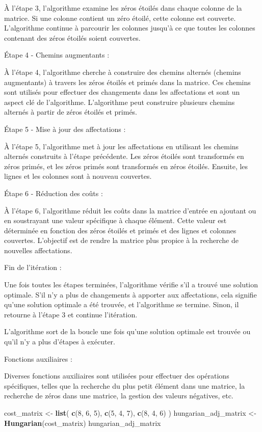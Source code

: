 \documentclass[
]{article}
\newenvironment{Shaded}{\begin{snugshade}}{\end{snugshade}}
\newcommand{\DecValTok}[1]{\textcolor[rgb]{0.00,0.00,0.81}{#1}}
\newcommand{\FunctionTok}[1]{\textcolor[rgb]{0.13,0.29,0.53}{\textbf{#1}}}
\newcommand{\NormalTok}[1]{#1}
\newcommand{\OtherTok}[1]{\textcolor[rgb]{0.56,0.35,0.01}{#1}}
\begin{document}
À l'étape 3, l'algorithme examine les zéros étoilés dans chaque colonne
de la matrice. Si une colonne contient un zéro étoilé, cette colonne est
couverte. L'algorithme continue à parcourir les colonnes jusqu'à ce que
toutes les colonnes contenant des zéros étoilés soient couvertes.

Étape 4 - Chemins augmentants :

À l'étape 4, l'algorithme cherche à construire des chemins alternés
(chemins augmentants) à travers les zéros étoilés et primés dans la
matrice. Ces chemins sont utilisés pour effectuer des changements dans
les affectations et sont un aspect clé de l'algorithme. L'algorithme
peut construire plusieurs chemins alternés à partir de zéros étoilés et
primés.

Étape 5 - Mise à jour des affectations :

À l'étape 5, l'algorithme met à jour les affectations en utilisant les
chemins alternés construits à l'étape précédente. Les zéros étoilés sont
transformés en zéros primés, et les zéros primés sont transformés en
zéros étoilés. Ensuite, les lignes et les colonnes sont à nouveau
couvertes.

Étape 6 - Réduction des coûts :

À l'étape 6, l'algorithme réduit les coûts dans la matrice d'entrée en
ajoutant ou en soustrayant une valeur spécifique à chaque élément. Cette
valeur est déterminée en fonction des zéros étoilés et primés et des
lignes et colonnes couvertes. L'objectif est de rendre la matrice plus
propice à la recherche de nouvelles affectations.

Fin de l'itération :

Une fois toutes les étapes terminées, l'algorithme vérifie s'il a trouvé
une solution optimale. S'il n'y a plus de changements à apporter aux
affectations, cela signifie qu'une solution optimale a été trouvée, et
l'algorithme se termine. Sinon, il retourne à l'étape 3 et continue
l'itération.

L'algorithme sort de la boucle une fois qu'une solution optimale est
trouvée ou qu'il n'y a plus d'étapes à exécuter.

Fonctions auxiliaires :

Diverses fonctions auxiliaires sont utilisées pour effectuer des
opérations spécifiques, telles que la recherche du plus petit élément
dans une matrice, la recherche de zéros dans une matrice, la gestion des
valeurs négatives, etc.

\begin{Shaded}
\begin{Highlighting}[]
\NormalTok{cost\_matrix }\OtherTok{\textless{}{-}} \FunctionTok{list}\NormalTok{(}
  \FunctionTok{c}\NormalTok{(}\DecValTok{8}\NormalTok{, }\DecValTok{6}\NormalTok{, }\DecValTok{5}\NormalTok{),}
  \FunctionTok{c}\NormalTok{(}\DecValTok{5}\NormalTok{, }\DecValTok{4}\NormalTok{, }\DecValTok{7}\NormalTok{),}
  \FunctionTok{c}\NormalTok{(}\DecValTok{8}\NormalTok{, }\DecValTok{4}\NormalTok{, }\DecValTok{6}\NormalTok{)}
\NormalTok{)}
\NormalTok{hungarian\_adj\_matrix }\OtherTok{\textless{}{-}} \FunctionTok{Hungarian}\NormalTok{(cost\_matrix)}
\NormalTok{hungarian\_adj\_matrix}
\end{Highlighting}
\end{Shaded}
\end{document}
